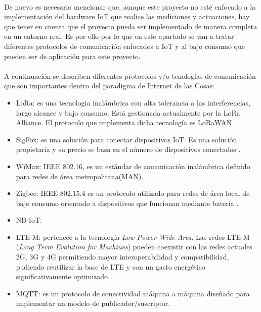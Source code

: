 \documentclass[../../memoria.tex]{subfiles}
\begin{document}
\paragraph{}
De nuevo es necesario mencionar que, aunque este proyecto no esté enfocado a la implementación del hardware IoT que realice las mediciones y actuaciones, hay que tener en cuenta que el proyecto pueda ser implementado de manera completa en un entorno real. Es por ello por lo que en este apartado se van a tratar diferentes protocolos de comunicación enfocados a IoT y al bajo consumo que pueden ser de aplicación para este proyecto.

\paragraph{}
A continuación se describen diferentes protocolos y/o tenologías de comunicación que son importantes dentro del paradigma de Internet de las Cosas:

\begin{itemize}
    \item LoRa: es una tecnologia inalámbrica con alta tolerancia a las interferencias, largo alcance y bajo consumo. Está gestionada actualmente por la LoRa Alliance. El protocolo que implementa dicha tecnología es LoRaWAN \cite{lora} \cite{loratech}.

    \item SigFox: es una solución para conectar dispositivos IoT. Es una solución propietaria y su precio se basa en el número de dispositivos conectados \cite{sigfox}.

    \item WiMax: IEEE 802.16, es un estándar de comunicación inalámbrica definido para redes de área metropolitana(MAN). \cite{wimax}

    \item Zigbee: IEEE 802.15.4 es un protocolo utilizado para redes de área local de bajo consumo orientado a dispositivos que funcionan mediante batería \cite{zigbee}.

    \item NB-IoT:  \cite{nbiot}

    \item LTE-M: pertenece a la tecnología \textit{Low Power Wide Area}. Las redes LTE-M (\textit{Long Term Evolution for Machines}) pueden coexistir con las redes actuales 2G, 3G y 4G permitiendo mayor interoperabilidad y compatibilidad, pudiendo reutilizar la base de LTE y con un gasto energético significativamente optimizado \cite{ltem}.

    \item MQTT: es un protocolo de conectividad máquina a máquina diseñado para implementar un modelo de publicador/suscriptor. \cite{mqtt}
\end{itemize}
\end{document}
